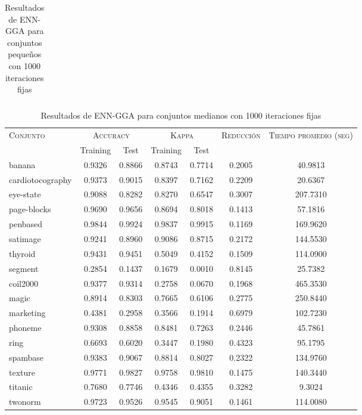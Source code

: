 \begin{table}[]
\begin{tabular}{l c c c c c c}
\hline
\end{tabular}
\caption{Resultados de ENN-GGA para conjuntos pequeños con 1000 iteraciones fijas}
\label{res-peq-enn-gga}
\end{table}



\begin{table}[]
\centering
\begin{tabular}{l c c c c c c}
\hline
\multirow{2}{*}{\textsc{Conjunto}}
	& \multicolumn{2}{c}{\textsc{Accuracy}}
	& \multicolumn{2}{c}{\textsc{Kappa}}
	& \textsc{Reducción}
	& \textsc{Tiempo promedio (seg)} \\
	& Training & Test
	& Training & Test \\ 
\hline
\hline

banana & 0.9326 & 0.8866 & 0.8743 & 0.7714 & 0.2005 & 40.9813 \\
cardiotocography & 0.9373 & 0.9015 & 0.8397 & 0.7162 & 0.2209 & 20.6367 \\
eye-state & 0.9088 & 0.8282 & 0.8270 & 0.6547 & 0.3007 & 207.7310 \\
page-blocks & 0.9690 & 0.9656 & 0.8694 & 0.8018 & 0.1413 & 57.1816 \\
penbased & 0.9844 & 0.9924 & 0.9837 & 0.9915 & 0.1169 & 169.9620 \\
satimage & 0.9241 & 0.8960 & 0.9086 & 0.8715 & 0.2172 & 144.5530 \\
thyroid & 0.9431 & 0.9451 & 0.5049 & 0.4152 & 0.1509 & 114.0900 \\
segment & 0.2854 & 0.1437 & 0.1679 & 0.0010 & 0.8145 & 25.7382 \\
coil2000 & 0.9377 & 0.9314 & 0.2758 & 0.0670 & 0.1968 & 465.3530 \\
magic & 0.8914 & 0.8303 & 0.7665 & 0.6106 & 0.2775 & 250.8440 \\
marketing & 0.4381 & 0.2958 & 0.3566 & 0.1914 & 0.6979 & 102.7230 \\
phoneme & 0.9308 & 0.8858 & 0.8481 & 0.7263 & 0.2446 & 45.7861 \\
ring & 0.6693 & 0.6020 & 0.3447 & 0.1980 & 0.4323 & 95.1795 \\
spambase & 0.9383 & 0.9067 & 0.8814 & 0.8027 & 0.2322 & 134.9760 \\
texture & 0.9771 & 0.9827 & 0.9758 & 0.9810 & 0.1475 & 140.3440 \\
titanic & 0.7680 & 0.7746 & 0.4346 & 0.4355 & 0.3282 & 9.3024 \\
twonorm & 0.9723 & 0.9526 & 0.9545 & 0.9051 & 0.1461 & 114.0080 \\

\hline
\end{tabular}
\caption{Resultados de ENN-GGA para conjuntos medianos con 1000 iteraciones fijas}
\label{res-med-enn-gga}
\end{table}



